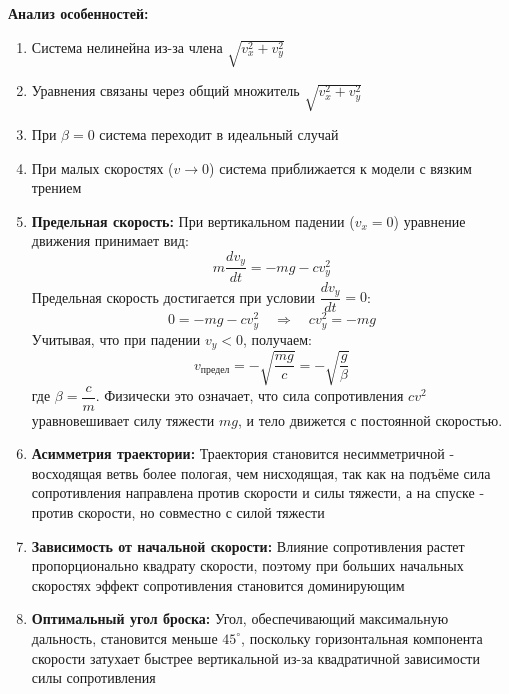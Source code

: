 \begin{center}
    \textbf{Анализ особенностей:}
\end{center}
    
\begin{enumerate}
    \item Система нелинейна из-за члена $\sqrt{v_x^2 + v_y^2}$
    \item Уравнения связаны через общий множитель $\sqrt{v_x^2 + v_y^2}$
    \item При $\beta = 0$ система переходит в идеальный случай
    \item При малых скоростях ($v \to 0$) система приближается к модели с вязким трением
    \item \textbf{Предельная скорость:} При вертикальном падении ($v_x = 0$) уравнение движения принимает вид:
    \[
    m\dfrac{dv_y}{dt} = -mg - c v_y^2
    \]
    Предельная скорость достигается при условии $\dfrac{dv_y}{dt} = 0$:
    \[
    0 = -mg - c v_y^2 \quad \Rightarrow \quad c v_y^2 = -mg
    \]
    Учитывая, что при падении $v_y < 0$, получаем:
    \[
    v_{\text{предел}} = -\sqrt{\dfrac{mg}{c}} = -\sqrt{\dfrac{g}{\beta}}
    \]
    где $\beta = \dfrac{c}{m}$. Физически это означает, что сила сопротивления $c v^2$ уравновешивает силу тяжести $mg$, и тело движется с постоянной скоростью.
    \item \textbf{Асимметрия траектории:} Траектория становится несимметричной - восходящая ветвь более пологая, чем нисходящая, так как на подъёме сила сопротивления направлена против скорости и силы тяжести, а на спуске - против скорости, но совместно с силой тяжести
    \item \textbf{Зависимость от начальной скорости:} Влияние сопротивления растет пропорционально квадрату скорости, поэтому при больших начальных скоростях эффект сопротивления становится доминирующим
    \item \textbf{Оптимальный угол броска:} Угол, обеспечивающий максимальную дальность, становится меньше $45^\circ$, поскольку горизонтальная компонента скорости затухает быстрее вертикальной из-за квадратичной зависимости силы сопротивления
\end{enumerate}

